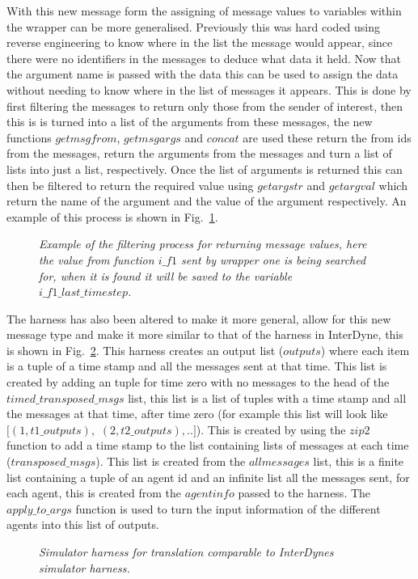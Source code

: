 \documentclass{article}
\begin{document}
With this new message form the assigning of message values to variables within the wrapper can be more generalised. Previously this was hard coded using reverse engineering to know where in the list the message would appear, since there were no identifiers in the messages to deduce what data it held. Now that the argument name is passed with the data this can be used to assign the data without needing to know where in the list of messages it appears. This is done by first filtering the messages to return only those from the sender of interest, then this is is turned into a list of the arguments from these messages, the new functions $getmsgfrom$, $getmsgargs$ and $concat$ are used these return the from ids from the messages, return the arguments from the messages and turn a list of lists into just a list, respectively. Once the list of arguments is returned this can then be filtered to return the required value using $getargstr$ and $getargval$ which return the name of the argument and the value of the argument respectively. An example of this process is shown in Fig.~\ref{fig:filter8}. 
\begin{figure}[H]
	\centering
	
	\caption{\it Example of the filtering process for returning message values, here the value from function $i\_f1$ sent by wrapper one is being searched for, when it is found it will be saved to the variable $i\_f1\_last\_timestep$.}
	\label{fig:filter8}
\end{figure} 

The harness has also been altered to make it more general, allow for this new message type and make it more similar to that of the harness in InterDyne, this is shown in Fig.~\ref{fig:harn8}. This harness creates an output list ($outputs$) where each item is a tuple of a time stamp and all the messages sent at that time. This list is created by adding an tuple for time zero with no messages to the head of the $timed\_transposed\_msgs$ list, this list is a list of tuples with a time stamp and all the messages at that time, after time zero (for example this list will look like $[(1, t1\_outputs),$ $(2, t2\_outputs), ..]$). This is created by using the $zip2$ function to add a time stamp to the list containing lists of messages at each time ($transposed\_msgs$). This list is created from the $allmessages$ list, this is a finite list containing a tuple of an agent id and an infinite list all the messages sent, for each agent, this is created from the $agentinfo$ passed to the harness. The $apply\_to\_args$ function is used to turn the input information of the different agents into this list of outputs.
\begin{figure}[H]
	\centering
	
	\caption{\it Simulator harness for translation comparable to InterDynes simulator harness.}
	\label{fig:harn8}
\end{figure} 
\end{document}
